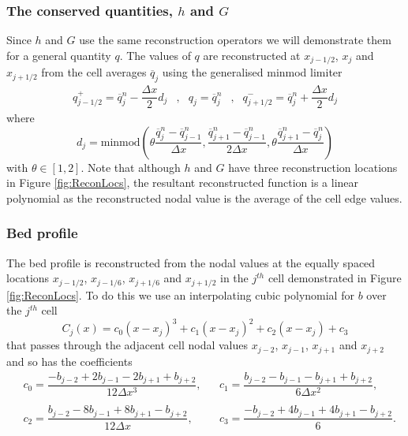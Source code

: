 \documentclass[times]{elsarticle}
\begin{document}
\subsubsection{The conserved quantities, $h$ and $G$ }
Since $h$ and $G$ use the same reconstruction operators we will demonstrate them for a general quantity $q$. The values of $q$ are reconstructed at $x_{j-1/2} $, $x_{j} $ and $x_{j+1/2}$ from the cell averages $\overline{q}_j$ using the generalised minmod limiter \cite{VanLeer-1979-101}
	\begin{align}
	q^+_{j-1/2} = \overline{q}^n_j - \dfrac{\Delta x}{2} d_j &,&
	q_{j}  =\overline{q}^n_j &,&
	q^-_{j+1/2}  = \overline{q}^n_j + \dfrac{\Delta x}{2} d_j
		\label{eqn:ReconforhwG}
	\end{align}
where 
\begin{equation}
d_j = \text{minmod}\left(\theta \dfrac{\overline{q}^n_j -\overline{q}^n_{j-1} }{\Delta x}, \dfrac{\overline{q}^n_{j+1} -\overline{q}^n_{j-1} }{2\Delta x}, \theta\dfrac{\overline{q}^n_{j+1} -\overline{q}^n_{j} }{\Delta x}\right)
\label{eqn:slopehGrecon}
\end{equation}
with $\theta \in \left[1,2\right]$. Note that although $h$ and $G$ have three reconstruction locations in Figure \ref{fig:ReconLocs}, the resultant reconstructed function is a linear polynomial as the reconstructed nodal value is the average of the cell edge values. 

\subsubsection{Bed profile }
The bed profile is reconstructed from the nodal values at the equally spaced locations $x_{j-1/2}$, $x_{j-1/6}$, $x_{j+1/6}$ and $x_{j+1/2}$ in the $j^{th}$ cell demonstrated in Figure \ref{fig:ReconLocs}. To do this we use an interpolating cubic polynomial for $b$ over the $j^{th}$ cell 
\begin{equation*}
C_j(x) = c_0 \left(x - x_j\right)^3 + c_1 \left(x - x_j\right)^2 + c_2 \left(x - x_j\right) + c_3
\label{eqn:cubicforbedrecon}
\end{equation*}
that passes through the adjacent cell nodal values $x_{j-2}$, $x_{j-1}$, $x_{j+1}$ and $x_{j+2}$ and so has the coefficients
\begin{align*}
&c_0 =  \dfrac{-b_{j-2} + 2b_{j-1} - 2 b_{j+1} + b_{j+2}}{12 \Delta x^3}, & &
c_1 =  \dfrac{b_{j-2} - b_{j-1} - b_{j+1} + b_{j+2}}{6 \Delta x^2},\\ \\
&c_2 =  \dfrac{b_{j-2} - 8b_{j-1} + 8 b_{j+1} - b_{j+2}}{12 \Delta x},& &
c_3 =  \dfrac{-b_{j-2}  + 4b_{j-1} + 4 b_{j+1} - b_{j+2}}{6}.
\end{align*}
\end{document}
